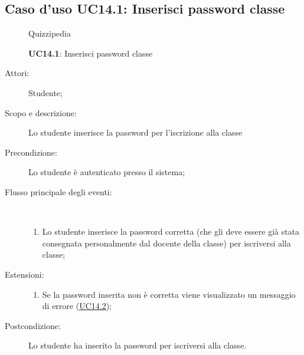 \subsection{Caso d'uso UC14.1: Inserisci password classe}
	\begin{figure}[H]
		\centering
		\begin{resizedtikzpicture}{\textwidth}
		\begin{umlsystem}[x=0, fill=lightgray!20]{Quizzipedia}
		\end{umlsystem}
		\end{resizedtikzpicture}
		\caption{\textbf{UC14.1}: Inserisci password classe}
		\label{UC14.1}
	\end{figure}
\begin{description}
\item[Attori:] Studente;
\item[Scopo e descrizione:] Lo studente inserisce la password per l'iscrizione alla classe
      \item[Precondizione:] Lo studente è autenticato presso il sistema;

        \item[Flusso principale degli eventi:] \ 
 \begin{enumerate}
          \item Lo studente inserisce la password corretta (che gli deve essere già stata consegnata personalmente dal docente della classe) per iscriversi alla classe;

      \end{enumerate}
    \item[Estensioni:]
      \begin{enumerate}
          \item Se la password inserita non è corretta viene visualizzato un messaggio di errore (\hyperlink{UC14.2}{UC14.2});

      \end{enumerate}
    \item[Postcondizione:] Lo studente ha inserito la password per iscriversi alla classe.
  \end{description}
\hypertarget{UC14.2}{}
